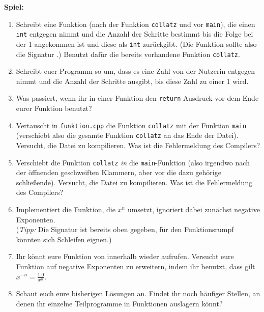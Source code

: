 \textbf{Spiel:}
\begin{enumerate}
	\item Schreibt eine Funktion (nach der Funktion \texttt{collatz} und vor \texttt{main}), die einen \texttt{int} entgegen nimmt und die Anzahl der Schritte bestimmt bis die Folge bei der 1 angekommen ist und diese als \texttt{int} zurückgibt.
	(Die Funktion sollte also die Signatur .)
	    Benutzt dafür die bereits vorhandene Funktion \texttt{collatz}.
	\item Schreibt euer Programm so um, dass es eine Zahl von der Nutzerin entgegen nimmt und die Anzahl der Schritte ausgibt, bis diese Zahl zu einer 1 wird.
    \item Was passiert, wenn ihr in einer Funktion den \texttt{return}-Ausdruck vor dem Ende eurer Funktion benutzt?
    \item Vertauscht in \texttt{funktion.cpp} die Funktion \texttt{collatz} mit der Funktion \texttt{main} (verschiebt also die gesamte Funktion \texttt{collatz} an das Ende der Datei).
        Versucht, die Datei zu kompilieren.
        Was ist die Fehlermeldung des Compilers?
    \item Verschiebt die Funktion \texttt{collatz} \emph{in} die \texttt{main}-Funktion (also irgendwo nach der öffnenden geschweiften Klammern, aber vor die dazu gehörige schließende).
        Versucht, die Datei zu kompilieren. Was ist die Fehlermeldung des Compilers?
    \item Implementiert die Funktion, die $x^n$ umsetzt, ignoriert dabei zunächst negative Exponenten. \\
        (\emph{Tipp:} Die Signatur ist bereits oben gegeben, für den Funktionsrumpf könnten sich Schleifen eignen.)
    \item Ihr könnt eure Funktion von innerhalb wieder aufrufen. Versucht eure Funktion auf negative Exponenten zu erweitern, indem ihr benutzt, dass gilt $x^{-n} = \frac{1.0}{x^n}$.
    \item Schaut euch eure bisherigen Lösungen an.
        Findet ihr noch häufiger Stellen, an denen ihr einzelne Teilprogramme in Funktionen auslagern könnt?
\end{enumerate}
